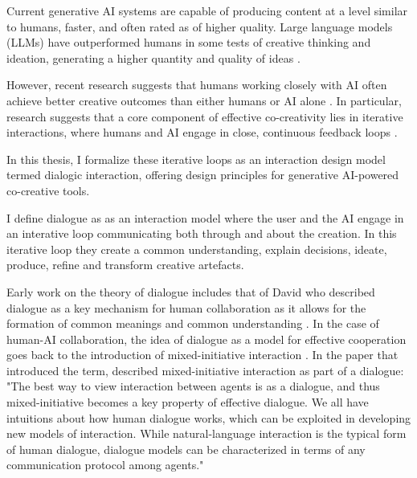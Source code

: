  Current generative AI systems are capable of producing content at a level similar to humans, faster, and often rated as of higher quality. Large language models (LLMs) have outperformed humans in some tests of creative thinking and ideation, generating a higher quantity and quality of ideas \cite{Guzik2023-cl, Haase2023-vz}. 

However, recent research suggests that humans working closely with AI often achieve better creative outcomes than either humans or AI alone \cite{Hitsuwari2023-tw, DellAcqua2023-og}. In particular, research suggests that a core component of effective co-creativity lies in iterative interactions, where humans and AI engage in close, continuous feedback loops \cite{Jia2024-vp}.

In this thesis, I formalize these iterative loops as an interaction design model termed dialogic interaction, offering design principles for generative AI-powered co-creative tools. 

I define dialogue as as an interaction model where the user and the AI engage in an interative loop communicating both through and about the creation. In this iterative loop they create a common understanding, explain decisions, ideate, produce, refine and transform creative artefacts. 

Early work on the theory of dialogue includes that of David who described dialogue as a key mechanism for human collaboration as it allows for the formation of common meanings and common understanding \cite{Bohm2013-ol}. In the case of human-AI collaboration, the idea of dialogue as a model for effective cooperation goes back to the introduction of mixed-initiative interaction \cite{Allen1999-sr}. In the paper that introduced the term, described mixed-initiative interaction as part of a dialogue: "The best way to view interaction between agents is as a dialogue, and thus mixed-initiative becomes a key property of effective dialogue. We all have intuitions about how human dialogue works, which can be exploited in developing new models of interaction. While natural-language interaction is the typical form of human dialogue, dialogue models can be characterized in terms of any communication protocol among agents."


